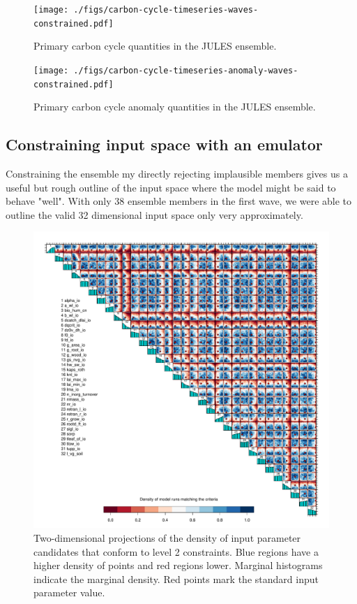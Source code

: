 \documentclass[gmd, manuscript]{copernicus}
\begin{document}

\begin{figure}[t]
\texttt{[image: ./figs/carbon-cycle-timeseries-waves-constrained.pdf]}
\caption{Primary carbon cycle quantities in the JULES ensemble.}
\label{fig:carbon-cycle-timeseries-waves-constrained}
\end{figure}

%
\begin{figure}[t]
\texttt{[image: ./figs/carbon-cycle-timeseries-anomaly-waves-constrained.pdf]}
\caption{Primary carbon cycle anomaly quantities in the JULES ensemble.}
\label{fig:carbon-cycle-timeseries-anomaly-waves-constrained}
\end{figure}


\subsection{Constraining input space with an emulator}\label{ssec:constraining_input_space_emulator}

Constraining the ensemble my directly rejecting implausible members gives us a useful but rough outline of the input space where the model might be said to behave "well". With only 38 ensemble members in the first wave, we were able to outline the valid 32 dimensional input space only very approximately.

\begin{figure}[t]
\includegraphics[width=12cm]{./figs/pairs_level2_ix_em_unif_wave00_wave01.pdf}
\caption{Two-dimensional projections of the density of input parameter candidates that conform to level 2 constraints. Blue regions have a higher density of points and red regions lower. Marginal histograms indicate the marginal density. Red points mark the standard input parameter value.}
\label{fig:pairs_level2_ix_em_unif_wave00_wave01}
\end{figure}
\end{document}

